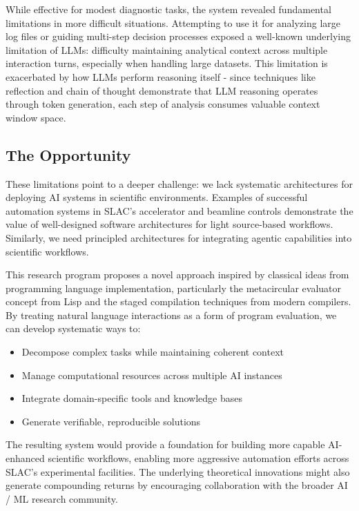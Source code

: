 \documentclass{article}
\begin{document}
While effective for modest diagnostic tasks, the system revealed fundamental limitations in more difficult situations. Attempting to use it for analyzing large log files or guiding multi-step decision processes exposed a well-known underlying limitation of LLMs: difficulty maintaining analytical context across multiple interaction turns, especially when handling large datasets. This limitation is exacerbated by how LLMs perform reasoning itself - since techniques like reflection and chain of thought demonstrate that LLM reasoning operates through token generation, each step of analysis consumes valuable context window space.

\subsection{The Opportunity}
These limitations point to a deeper challenge: we lack systematic architectures for deploying AI systems in scientific environments. Examples of successful automation systems in SLAC's accelerator and beamline controls demonstrate the value of well-designed software architectures for light source-based workflows. Similarly, we need principled architectures for integrating agentic capabilities into scientific workflows.

This research program proposes a novel approach inspired by classical ideas from programming language implementation, particularly the metacircular evaluator concept from Lisp and the staged compilation techniques from modern compilers. By treating natural language interactions as a form of program evaluation, we can develop systematic ways to:

\begin{itemize}
    \item Decompose complex tasks while maintaining coherent context
    \item Manage computational resources across multiple AI instances
    \item Integrate domain-specific tools and knowledge bases
    \item Generate verifiable, reproducible solutions
\end{itemize}

The resulting system would provide a foundation for building more capable AI-enhanced scientific workflows, enabling more aggressive automation efforts across SLAC's experimental facilities. The underlying theoretical innovations might also generate compounding returns by encouraging collaboration with the broader AI / ML research community.
\end{document}
